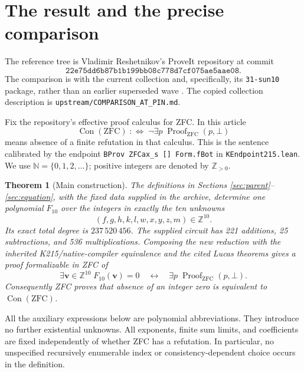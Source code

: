 \documentclass[11pt]{article}
\newcommand{\Z}{\mathbb Z}
\newcommand{\N}{\mathbb N}
\newcommand{\Con}{\operatorname{Con}}
\newcommand{\ZFC}{\mathrm{ZFC}}
\newcommand{\file}[1]{\nolinkurl{#1}}
\newtheorem{theorem}{Theorem}[section]
\theoremstyle{definition}
\theoremstyle{remark}
\numberwithin{equation}{section}
\begin{document}
\newpage
{\small\setlength{\parskip}{0pt}\tableofcontents}
\newpage

\section{The result and the precise comparison}
\label{sec:result}

The reference tree is Vladimir Reshetnikov's ProveIt repository at commit
\[
\texttt{22e75dd6b87b1b199bb08c778d7cf075ae5aae08}.
\]
The comparison is with the current collection and, specifically, its
\file{31-sun10} package, rather than an earlier superseded wave
\cite{repo,package31}. The copied collection description is
\file{upstream/COMPARISON_AT_PIN.md}.

Fix the repository's effective proof calculus for ZFC. In this article
\[
 \Con(\ZFC)\;:\Longleftrightarrow\;
 \neg\exists p\;\operatorname{Proof}_{\ZFC}(p,\bot)
\]
means absence of a finite refutation in that calculus. This is the sentence
calibrated by the endpoint
\file{BProv ZFCax_s [] Form.fBot} in \file{KEndpoint215.lean}.
We use \(\N=\{0,1,2,\ldots\}\); positive integers are denoted by
\(\Z_{>0}\).

\begin{theorem}[Main construction]\label{thm:main}
The definitions in Sections \ref{sec:parent}--\ref{sec:equation}, with the
fixed data supplied in the archive, determine one polynomial \(F_{10}\)
over the integers in exactly the ten unknowns
\[
 (f,g,h,k,l,w,x,y,z,m)\in\Z^{10}.
\]
Its exact total degree is \(237\,520\,456\). The supplied circuit has
221 additions, 25 subtractions, and 536 multiplications.
Composing the new reduction with the inherited K215/native-compiler
equivalence and the cited Lucas theorems gives a proof formalizable in ZFC of
\begin{equation}\label{eq:main}
 \exists\mathbf v\in\Z^{10}\;F_{10}(\mathbf v)=0
 \quad\longleftrightarrow\quad
 \exists p\;\operatorname{Proof}_{\ZFC}(p,\bot).
\end{equation}
Consequently ZFC proves that absence of an integer zero is equivalent to
\(\Con(\ZFC)\).
\end{theorem}

All the auxiliary expressions below are polynomial abbreviations. They
introduce no further existential unknowns. All exponents, finite sum limits,
and coefficients are fixed independently of whether ZFC has a refutation.
In particular, no unspecified recursively enumerable index or
consistency-dependent choice occurs in the definition.
\end{document}
